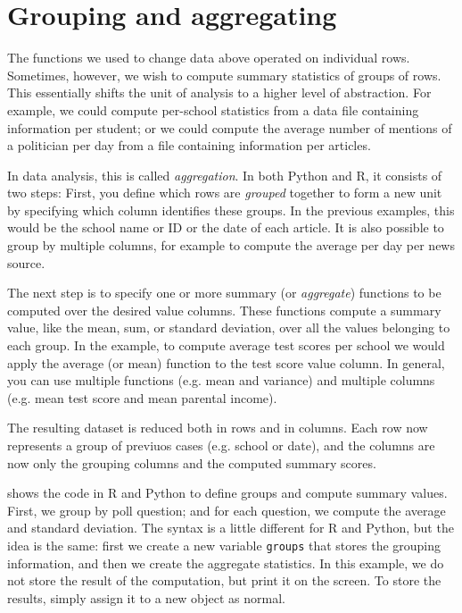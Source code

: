 \section{Grouping and aggregating}

The functions we used to change data above operated on individual rows.
Sometimes, however, we wish to compute summary statistics of groups of rows.
This essentially shifts the unit of analysis to a higher level of abstraction.
For example, we could compute per-school statistics from a data file containing information per student;
or we could compute the average number of mentions of a politician per day from a file containing information per articles.

In data analysis, this is called \emph{aggregation}.
In both Python and R, it consists of two steps:
First, you define which rows are \emph{grouped} together to form a new unit
by specifying which column identifies these groups.
In the previous examples, this would be the school name or ID or the date of each article.
It is also possible to group by multiple columns, for example to compute the average per day per news source.

The next step is to specify one or more summary (or \emph{aggregate}) functions to be computed over the desired value columns.
These functions compute a summary value, like the mean, sum, or standard deviation, over all the values belonging to each group.
In the example, to compute average test scores per school we would apply the average (or mean) function to the test score value column.
In general, you can use multiple functions (e.g.  mean and variance) and multiple columns (e.g. mean test score and mean parental income).

The resulting dataset is reduced both in rows and in columns.
Each row now represents a group of previuos cases (e.g. school or date),
and the columns are now only the grouping columns and the computed summary scores.

 shows the code in R and Python to define groups and compute summary values.
First, we group by poll question; and for each question, we compute the average and standard deviation.
The syntax is a little different for R and Python, but the idea is the same:
first we create a new variable \verb+groups+ that stores the grouping information,
and then we create the aggregate statistics.
In this example, we do not store the result of the computation, but print it on the screen.
To store the results, simply assign it to a new object as normal.

